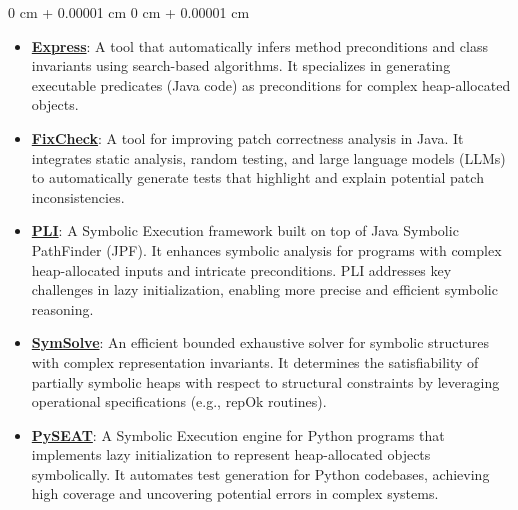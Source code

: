 \documentclass[10pt, letterpaper]{article}
\newenvironment{highlightsforbulletentries}{
    \begin{itemize}[
        topsep=0.10 cm,
        parsep=0.10 cm,
        partopsep=0pt,
        itemsep=0pt,
        leftmargin=10pt
    ]
}{
    \end{itemize}
} %
\newenvironment{onecolentry}{
    \begin{adjustwidth}{
        0 cm + 0.00001 cm
    }{
        0 cm + 0.00001 cm
    }
}{
    \end{adjustwidth}
} %
\begin{document}
    \begin{onecolentry}
        \begin{highlightsforbulletentries}

        \item \href{https://github.com/JuanmaCopia/express/}{\textbf{Express}}:
        A tool that automatically infers method preconditions and class
        invariants using search-based algorithms. It specializes in generating
        executable predicates (Java code) as preconditions for complex
        heap-allocated objects.

        \vspace{0.2 cm}

        \item \href{https://github.com/facumolina/fixcheck/}{\textbf{FixCheck}}:
        A tool for improving patch correctness analysis in Java. It integrates
        static analysis, random testing, and large language models (LLMs) to
        automatically generate tests that highlight and explain potential patch
        inconsistencies.

        \vspace{0.2 cm}

        \item \href{https://github.com/JuanmaCopia/spf-pli/}{\textbf{PLI}}:
        A Symbolic Execution framework built on top of Java Symbolic PathFinder
        (JPF). It enhances symbolic analysis for programs with complex
        heap-allocated inputs and intricate preconditions. PLI addresses key
        challenges in lazy initialization, enabling more precise and efficient
        symbolic reasoning.

        \vspace{0.2 cm}

        \item \href{https://github.com/JuanmaCopia/SymSolve/}{\textbf{SymSolve}}:
        An efficient bounded exhaustive solver for symbolic structures with
        complex representation invariants. It determines the satisfiability of
        partially symbolic heaps with respect to structural constraints by
        leveraging operational specifications (e.g., repOk routines).

        \vspace{0.2 cm}

        \item \href{https://github.com/JuanmaCopia/PySEAT/}{\textbf{PySEAT}}:
        A Symbolic Execution engine for Python programs that implements lazy
        initialization to represent heap-allocated objects symbolically. It
        automates test generation for Python codebases, achieving high coverage
        and uncovering potential errors in complex systems.

        \end{highlightsforbulletentries}
    \end{onecolentry}
\end{document}
